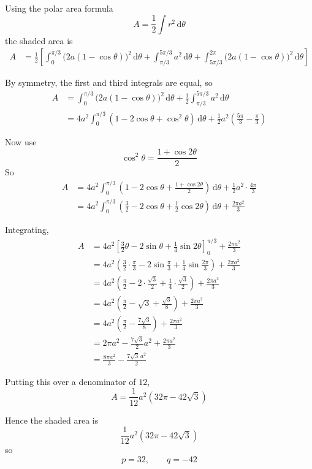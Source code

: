 \documentclass[leqno]{article}
\begin{document}
\begin{enumerate}[
	  label=\textbf{\arabic*.},
	  leftmargin=*,
	  topsep=0pt,
	  partopsep=0pt,
	  parsep=0pt
	]
\begin{tcolorbox}[colback=white, colframe=scarlet, title={\textbf{Solution}}, breakable, grow to left by=6mm, grow to right by=10mm]
\begin{enumerate}[label=\textbf{(\alph*)}]
	Using the polar area formula
	\[
	A=\frac12\int r^2\,\mathrm{d}\theta
	\]
	the shaded area is
	\begin{align*}
	A&=\frac12\left[
	\int_0^{\pi/3}\bigl(2a(1-\cos\theta)\bigr)^2\,\mathrm{d}\theta
	+\int_{\pi/3}^{5\pi/3}a^2\,\mathrm{d}\theta
	+\int_{5\pi/3}^{2\pi}\bigl(2a(1-\cos\theta)\bigr)^2\,\mathrm{d}\theta
	\right]
	\end{align*}
	
	By symmetry, the first and third integrals are equal, so
	\begin{align*}
	A&=\int_0^{\pi/3}\bigl(2a(1-\cos\theta)\bigr)^2\,\mathrm{d}\theta
	+\frac12\int_{\pi/3}^{5\pi/3}a^2\,\mathrm{d}\theta \\
	&=4a^2\int_0^{\pi/3}(1-2\cos\theta+\cos^2\theta)\,\mathrm{d}\theta
	+\frac12a^2\left(\frac{5\pi}{3}-\frac{\pi}{3}\right)
	\end{align*}
	
	Now use
	\[
	\cos^2\theta=\frac{1+\cos2\theta}{2}
	\]
	So
	\begin{align*}
	A&=4a^2\int_0^{\pi/3}\left(1-2\cos\theta+\frac{1+\cos2\theta}{2}\right)\,\mathrm{d}\theta
	+\frac12a^2\cdot\frac{4\pi}{3} \\
	&=4a^2\int_0^{\pi/3}\left(\frac32-2\cos\theta+\frac12\cos2\theta\right)\,\mathrm{d}\theta
	+\frac{2\pi a^2}{3}
	\end{align*}
	
	Integrating,
	\begin{align*}
	A&=4a^2\left[\frac32\theta-2\sin\theta+\frac14\sin2\theta\right]_0^{\pi/3}
	+\frac{2\pi a^2}{3} \\
	&=4a^2\left(\frac32\cdot\frac{\pi}{3}-2\sin\frac{\pi}{3}+\frac14\sin\frac{2\pi}{3}\right)
	+\frac{2\pi a^2}{3} \\
	&=4a^2\left(\frac{\pi}{2}-2\cdot\frac{\sqrt3}{2}+\frac14\cdot\frac{\sqrt3}{2}\right)
	+\frac{2\pi a^2}{3} \\
	&=4a^2\left(\frac{\pi}{2}-\sqrt3+\frac{\sqrt3}{8}\right)
	+\frac{2\pi a^2}{3} \\
	&=4a^2\left(\frac{\pi}{2}-\frac{7\sqrt3}{8}\right)
	+\frac{2\pi a^2}{3} \\
	&=2\pi a^2-\frac{7\sqrt3}{2}a^2+\frac{2\pi a^2}{3} \\
	&=\frac{8\pi a^2}{3}-\frac{7\sqrt3\,a^2}{2}
	\end{align*}
	
	Putting this over a denominator of $12$,
	\[
	A=\frac{1}{12}a^2(32\pi-42\sqrt3)
	\]
	
	Hence the shaded area is
	\[
	\frac{1}{12}a^2(32\pi-42\sqrt3)
	\]
	so
	\[
	p=32,\qquad q=-42
	\]
	\end{enumerate}
	\end{tcolorbox}
	

\end{enumerate}
\end{document}
